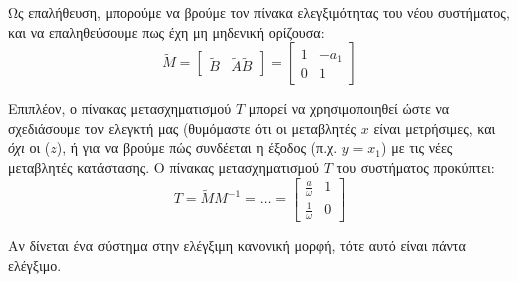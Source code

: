 \documentclass[11pt,a4paper,notitlepage,fleqn]{article}
\begin{document}
\begin{exercise}[Παράδειγμα]
	Ως επαλήθευση, μπορούμε να βρούμε τον πίνακα ελεγξιμότητας του νέου
	συστήματος, και να επαληθεύσουμε πως έχη μη μηδενική ορίζουσα:
	\[
	\tilde M = \left[\begin{matrix}
	\tilde B & \tilde A \tilde B
	\end{matrix}\right] = \left[\begin{matrix}
	1 & -a_1 \\ 0 & 1
	\end{matrix}\right]
	\]
	
	Επιπλέον, ο πίνακας μετασχηματισμού \( T \) μπορεί να χρησιμοποιηθεί
	ώστε να σχεδιάσουμε τον ελεγκτή μας (θυμόμαστε ότι οι μεταβλητές
	\( x \) είναι μετρήσιμες, και \textit{όχι} οι (\( z \)), ή για
	να βρούμε πώς συνδέεται η έξοδος (π.χ. \( y= x_1 \)) με τις νέες μεταβλητές κατάστασης.
	Ο πίνακας μετασχηματισμού \( T \) του συστήματος προκύπτει:
	\[
	T = \tilde M M^{-1} = \dots = \left[\begin{matrix}
	\frac{a}{\omega} & 1 \\ \frac{1}{\omega} & 0
	\end{matrix}\right]
	\]
\end{exercise}

\begin{infobox}{}
	Αν δίνεται ένα σύστημα στην ελέγξιμη κανονική μορφή, τότε αυτό
	είναι πάντα ελέγξιμο.
\end{infobox}
\end{document}
